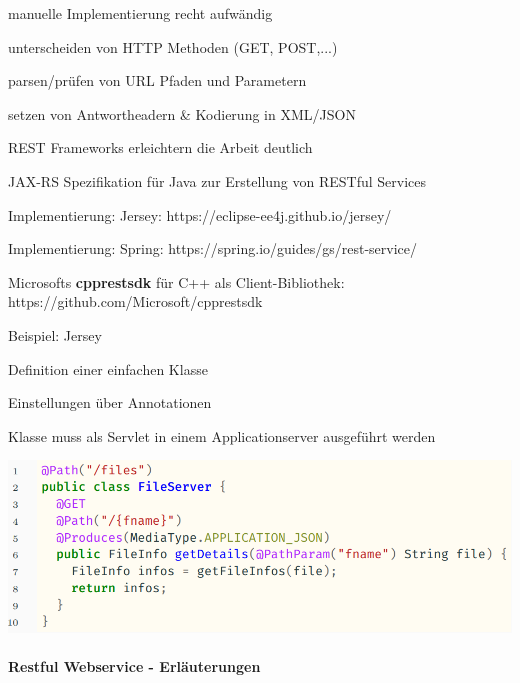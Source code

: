 \documentclass[10pt]{article}
\begin{document}
\begin{itemize*}
  \item manuelle Implementierung recht aufwändig
  \begin{itemize*}
    \item unterscheiden von HTTP Methoden (GET, POST,...)
    \item parsen/prüfen von URL Pfaden und Parametern
    \item setzen von Antwortheadern \& Kodierung in XML/JSON
  \end{itemize*}
  \item REST Frameworks erleichtern die Arbeit deutlich
  \begin{itemize*}
    \item JAX-RS Spezifikation für Java zur Erstellung von RESTful Services
    \begin{itemize*}
      \item Implementierung: Jersey: https://eclipse-ee4j.github.io/jersey/
      \item Implementierung: Spring:
      https://spring.io/guides/gs/rest-service/
    \end{itemize*}
    \item Microsofts \textbf{cpprestsdk} für C++ als Client-Bibliothek:
    https://github.com/Microsoft/cpprestsdk
  \end{itemize*}
\end{itemize*}
\begin{itemize*}
  \item Beispiel: Jersey
  \item Definition einer einfachen Klasse
  \begin{itemize*}
    \item Einstellungen über Annotationen
    \item Klasse muss als Servlet in einem Applicationserver ausgeführt werden
  \end{itemize*}
\end{itemize*}
\begin{center}
  \includegraphics[width=0.4\linewidth]{Assets/Programmierparadigmen-code-snippet-71}
\end{center}

\paragraph{Restful Webservice - Erläuterungen}
\end{document}
